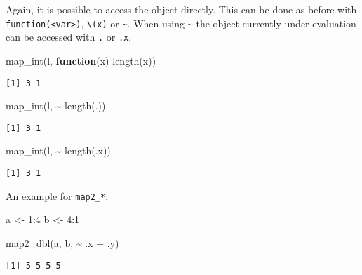 \documentclass[ignorenonframetext,,t]{beamer}
\let\oldtextbf\textbf
\renewcommand{\textbf}[1]{\textcolor{spamwell}{\oldtextbf{#1}}}
\newenvironment{Shaded}{\begin{snugshade}}{\end{snugshade}}
\newcommand{\ControlFlowTok}[1]{\textcolor[rgb]{0.13,0.29,0.53}{\textbf{#1}}}
\newcommand{\DecValTok}[1]{\textcolor[rgb]{0.00,0.00,0.81}{#1}}
\newcommand{\FunctionTok}[1]{\textcolor[rgb]{0.00,0.00,0.00}{#1}}
\newcommand{\NormalTok}[1]{#1}
\newcommand{\OtherTok}[1]{\textcolor[rgb]{0.56,0.35,0.01}{#1}}
\newcommand{\SpecialCharTok}[1]{\textcolor[rgb]{0.00,0.00,0.00}{#1}}
\begin{document}
\begin{frame}[fragile]
Again, it is possible to access the object directly. This can be done as
before with \texttt{function(\textless{}var\textgreater{})},
\texttt{\textbackslash{}(x)} or \texttt{\textasciitilde{}}. When using
\texttt{\textasciitilde{}} the object currently under evaluation can be
accessed with \texttt{.} or \texttt{.x}.

\begin{Shaded}
\begin{Highlighting}[]
\FunctionTok{map\_int}\NormalTok{(l, }\ControlFlowTok{function}\NormalTok{(x) }\FunctionTok{length}\NormalTok{(x))}
\end{Highlighting}
\end{Shaded}

\begin{verbatim}
[1] 3 1
\end{verbatim}

\begin{Shaded}
\begin{Highlighting}[]
\FunctionTok{map\_int}\NormalTok{(l, }\SpecialCharTok{\textasciitilde{}} \FunctionTok{length}\NormalTok{(.))}
\end{Highlighting}
\end{Shaded}

\begin{verbatim}
[1] 3 1
\end{verbatim}

\begin{Shaded}
\begin{Highlighting}[]
\FunctionTok{map\_int}\NormalTok{(l, }\SpecialCharTok{\textasciitilde{}} \FunctionTok{length}\NormalTok{(.x))}
\end{Highlighting}
\end{Shaded}

\begin{verbatim}
[1] 3 1
\end{verbatim}
\end{frame}

\begin{frame}[fragile]
An example for \texttt{map2\_*}:

\begin{Shaded}
\begin{Highlighting}[]
\NormalTok{a }\OtherTok{\textless{}{-}} \DecValTok{1}\SpecialCharTok{:}\DecValTok{4}
\NormalTok{b }\OtherTok{\textless{}{-}} \DecValTok{4}\SpecialCharTok{:}\DecValTok{1}

\FunctionTok{map2\_dbl}\NormalTok{(a, b, }\SpecialCharTok{\textasciitilde{}}\NormalTok{ .x }\SpecialCharTok{+}\NormalTok{ .y)}
\end{Highlighting}
\end{Shaded}

\begin{verbatim}
[1] 5 5 5 5
\end{verbatim}
\end{frame}
\end{document}
